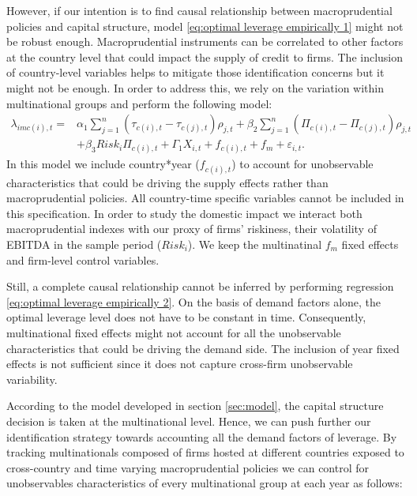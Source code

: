 \documentclass[12pt]{article}
\begin{document}
	However, if our intention is to find causal relationship between macroprudential policies and capital structure, model \ref{eq:optimal leverage empirically 1} might not be robust enough. Macroprudential instruments can be correlated to other factors at the country level that could impact the supply of credit to firms. The inclusion of country-level variables helps to mitigate those identification concerns but it might not be enough. In order to address this, we rely on the variation within multinational groups and perform the following model:
	\begin{equation}
	\begin{aligned}
	\lambda_{imc(i),t}=&\alpha_1\sum_{j=1}^{n}(\tau_{c(i),t}-\tau_{c(j),t})\rho_{j,t}+\beta_2\sum_{j=1}^{n}(\Pi_{c(i),t}-\Pi_{c(j),t})\rho_{j,t}\\
	&+\beta_3Risk_{i}\Pi_{c(i),t}+\Gamma_1 X_{i,t}+f_{c(i),t}+f_{m}+\varepsilon_{i,t}.
	\label{eq:optimal leverage empirically 2}
	\end{aligned}
	\end{equation}
	In this model we include country*year ($f_{c(i),t}$) to account for unobservable characteristics that could be driving the supply effects rather than macroprudential policies. All country-time specific variables cannot be included in this specification. In order to study the domestic impact we interact both macroprudential indexes with our proxy of firms' riskiness, their volatility of EBITDA in the sample period ($Risk_{i}$). We keep the multinatinal $f_{m}$ fixed effects and firm-level control variables.  
	
	Still, a complete causal relationship cannot be inferred by performing regression \ref{eq:optimal leverage empirically 2}. On the basis of demand factors alone, the optimal leverage level does not have to be constant in time. Consequently, multinational fixed effects might not account for all the unobservable characteristics that could be driving the demand side. The inclusion of year fixed effects is not sufficient since it does not capture cross-firm unobservable variability.  
	
	According to the model developed in section \ref{sec:model}, the capital structure decision is taken at the multinational level. Hence, we can push further our identification strategy towards accounting all the demand factors of leverage. By tracking multinationals composed of firms hosted at different countries exposed to cross-country and time varying macroprudential policies we can control for unobservables characteristics of every multinational group at each year as follows:   
	
\end{document}
